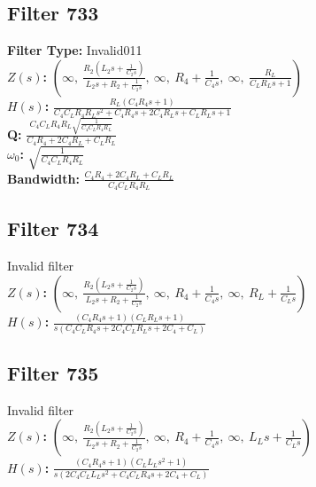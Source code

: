 \documentclass{article}
\begin{document}
\subsection*{Filter 733}
\textbf{Filter Type:} Invalid011 \\ 
\textbf{$Z(s)$:} $\left( \infty, \  \frac{R_{2} \left(L_{2} s + \frac{1}{C_{2} s}\right)}{L_{2} s + R_{2} + \frac{1}{C_{2} s}}, \  \infty, \  R_{4} + \frac{1}{C_{4} s}, \  \infty, \  \frac{R_{L}}{C_{L} R_{L} s + 1}\right)$ \\ 
\textbf{$H(s)$:} $\frac{R_{L} \left(C_{4} R_{4} s + 1\right)}{C_{4} C_{L} R_{4} R_{L} s^{2} + C_{4} R_{4} s + 2 C_{4} R_{L} s + C_{L} R_{L} s + 1}$ \\ 
\textbf{Q:} $\frac{C_{4} C_{L} R_{4} R_{L} \sqrt{\frac{1}{C_{4} C_{L} R_{4} R_{L}}}}{C_{4} R_{4} + 2 C_{4} R_{L} + C_{L} R_{L}}$ \\ 
\textbf{$\omega_0$:} $\sqrt{\frac{1}{C_{4} C_{L} R_{4} R_{L}}}$ \\ 
\textbf{Bandwidth:} $\frac{C_{4} R_{4} + 2 C_{4} R_{L} + C_{L} R_{L}}{C_{4} C_{L} R_{4} R_{L}}$ \\ 
\subsection*{Filter 734}
Invalid filter \\ 
\textbf{$Z(s)$:} $\left( \infty, \  \frac{R_{2} \left(L_{2} s + \frac{1}{C_{2} s}\right)}{L_{2} s + R_{2} + \frac{1}{C_{2} s}}, \  \infty, \  R_{4} + \frac{1}{C_{4} s}, \  \infty, \  R_{L} + \frac{1}{C_{L} s}\right)$ \\ 
\textbf{$H(s)$:} $\frac{\left(C_{4} R_{4} s + 1\right) \left(C_{L} R_{L} s + 1\right)}{s \left(C_{4} C_{L} R_{4} s + 2 C_{4} C_{L} R_{L} s + 2 C_{4} + C_{L}\right)}$ \\ 
\subsection*{Filter 735}
Invalid filter \\ 
\textbf{$Z(s)$:} $\left( \infty, \  \frac{R_{2} \left(L_{2} s + \frac{1}{C_{2} s}\right)}{L_{2} s + R_{2} + \frac{1}{C_{2} s}}, \  \infty, \  R_{4} + \frac{1}{C_{4} s}, \  \infty, \  L_{L} s + \frac{1}{C_{L} s}\right)$ \\ 
\textbf{$H(s)$:} $\frac{\left(C_{4} R_{4} s + 1\right) \left(C_{L} L_{L} s^{2} + 1\right)}{s \left(2 C_{4} C_{L} L_{L} s^{2} + C_{4} C_{L} R_{4} s + 2 C_{4} + C_{L}\right)}$ \\ 
\end{document}
